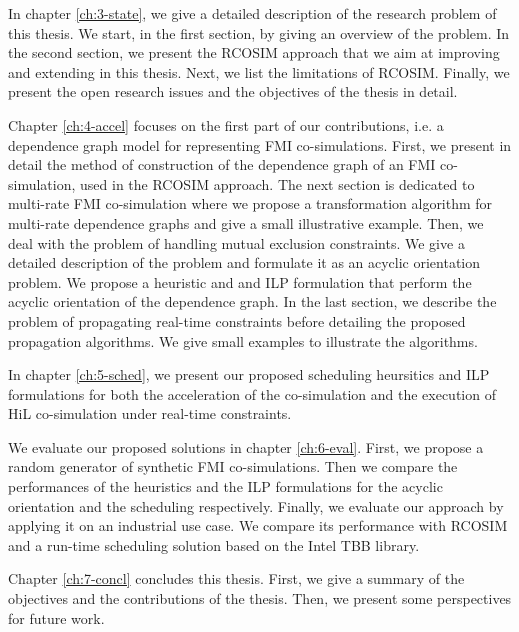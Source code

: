 In chapter \ref{ch:3-state}, we give a detailed description of the research problem of this thesis. We start, in the first section, by giving an overview of the problem. In the second section, we present the RCOSIM approach that we aim at improving and extending in this thesis. Next, we list the limitations of RCOSIM. Finally, we present the open research issues and the objectives of the thesis in detail.

Chapter \ref{ch:4-accel} focuses on the first part of our contributions, i.e. a dependence graph model for representing FMI co-simulations. First, we present in detail the method of construction of the dependence graph of an FMI co-simulation, used in the RCOSIM approach. The next section is dedicated to multi-rate FMI co-simulation where we propose a transformation algorithm for multi-rate dependence graphs and give a small illustrative example. Then, we deal with the problem of handling mutual exclusion constraints. We give a detailed description of the problem and formulate it as an acyclic orientation problem. We propose a heuristic and and ILP formulation that perform the acyclic orientation of the dependence graph. In the last section, we describe the problem of propagating real-time constraints before detailing the proposed propagation algorithms. We give small examples to illustrate the algorithms.

In chapter \ref{ch:5-sched}, we present our proposed scheduling heursitics and ILP formulations for both the acceleration of the co-simulation and the execution of HiL co-simulation under real-time constraints.

We evaluate our proposed solutions in chapter \ref{ch:6-eval}. First, we propose a random generator of synthetic FMI co-simulations. Then we compare the performances of the heuristics and the ILP formulations for the acyclic orientation and the scheduling respectively. Finally, we evaluate our approach by applying it on an industrial use case. We compare its performance with RCOSIM and a run-time scheduling solution based on the Intel TBB library.

Chapter \ref{ch:7-concl} concludes this thesis. First, we give a summary of the objectives and the contributions of the thesis. Then, we present some perspectives for future work. 
